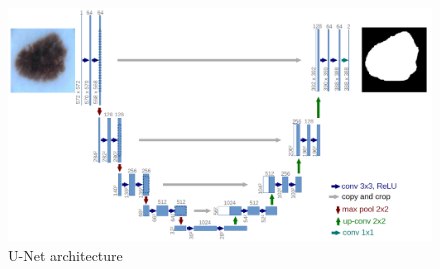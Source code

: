 \begin{figure}
    \centerline{\includegraphics[width=1\columnwidth]{02-related-works/figures/u-net-architecture.png}}
    \caption{ U-Net architecture \cite{ronneberger2015u} }
    \label{fig:unet-architecture}
\end{figure}